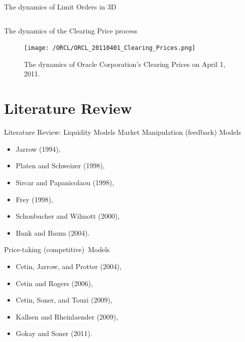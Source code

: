 \documentclass{beamer}
\begin{document}
\begin{frame}[shrink=40]{{\color{cyan}The dynamics of Limit Orders in 3D}}
\begin{columns}
\end{columns}

\end{frame}

\begin{frame}[shrink=30]{{\color{cyan}The dynamics of the Clearing Price process}}
\bigskip
\begin{figure}[H]
\begin{center}
	\texttt{[image: /ORCL/ORCL\_20110401\_Clearing\_Prices.png]}
\caption{The dynamics of Oracle Corporation's Clearing Prices on April 1, 2011.}
\label{fig:the_dynamics_ORCL_pi_20110401}
\end{center}
\end{figure}
\end{frame}

\section{Literature Review}
\begin{frame}[shrink=30]{{\color{cyan}Literature Review: Liquidity Models}}
\bigskip
Market Manipulation (feedback) Models
\begin{itemize}
\item Jarrow (1994),
\item Platen and Schweizer (1998),
\item Sircar and Papanicolaou (1998),
\item Frey (1998),
\item Schonbucher and Wilmott (2000),
\item Bank and Baum (2004).
\end{itemize}

\bigskip
Price-taking (competitive)\ Models
\begin{itemize}
\item Cetin, Jarrow, and Protter (2004),
\item Cetin and Rogers (2006),
\item Cetin, Soner, and Touzi (2009),
\item Kallsen and Rheinlaender (2009),
\item Gokay and Soner (2011).
\end{itemize}

\end{frame}
\end{document}
